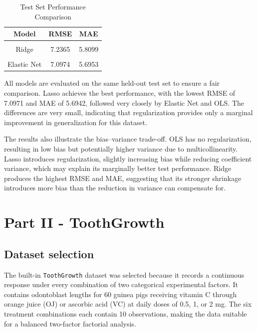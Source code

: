 \documentclass[
  11pt,
]{article}
\begin{document}
\begin{table}[!h]
\centering
\caption{\label{tab:evaluation}Test Set Performance Comparison}
\centering
\fontsize{10}{12}\selectfont
\begin{tabular}[t]{ccc}
\toprule
\textbf{Model} & \textbf{RMSE} & \textbf{MAE}\\
\midrule
\cellcolor{gray!10}{OLS} & \cellcolor{gray!10}{7.1021} & \cellcolor{gray!10}{5.6944}\\
Ridge & 7.2365 & 5.8099\\
\cellcolor{gray!10}{Lasso} & \cellcolor{gray!10}{7.0971} & \cellcolor{gray!10}{5.6942}\\
Elastic Net & 7.0974 & 5.6953\\
\bottomrule
\end{tabular}
\end{table}

All models are evaluated on the same held-out test set to ensure a fair
comparison. Lasso achieves the best performance, with the lowest RMSE of
7.0971 and MAE of 5.6942, followed very closely by Elastic Net and OLS.
The differences are very small, indicating that regularization provides
only a marginal improvement in generalization for this dataset.

The results also illustrate the bias--variance trade-off. OLS has no
regularization, resulting in low bias but potentially higher variance
due to multicollinearity. Lasso introduces regularization, slightly
increasing bias while reducing coefficient variance, which may explain
its marginally better test performance. Ridge produces the highest RMSE
and MAE, suggesting that its stronger shrinkage introduces more bias
than the reduction in variance can compensate for.

\section{Part II - ToothGrowth}\label{part-ii---toothgrowth}

\subsection{Dataset selection}\label{dataset-selection}

The built-in \texttt{ToothGrowth} dataset was selected because it
records a continuous response under every combination of two categorical
experimental factors. It contains odontoblast lengths for 60 guinea pigs
receiving vitamin C through orange juice (OJ) or ascorbic acid (VC) at
daily doses of 0.5, 1, or 2 mg. The six treatment combinations each
contain 10 observations, making the data suitable for a balanced
two-factor factorial analysis.
\end{document}
